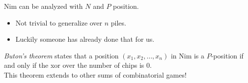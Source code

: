 \documentclass[12pt,t]{beamer}
\newcommand{\bi}{\begin{itemize}}
\newcommand{\ei}{\end{itemize}}
\begin{document}
\begin{frame}
  \vspace{40pt}
  Nim can be analyzed with $N$ and $P$ position.
  \bi
    \item Not trivial to generalize over $n$ piles.
    \item Luckily someone has already done that for us.
  \ei
  \vspace{10pt}
  \emph{Buton's theorem} states that a position $(x_1, x_2, \ldots, x_n)$ in
  Nim is a $P$-position if and only if the xor over the number of chips is
  $0$. \\
  \vspace{10pt}
  This theorem extends to other sums of combinatorial games!
\end{frame}
\end{document}
